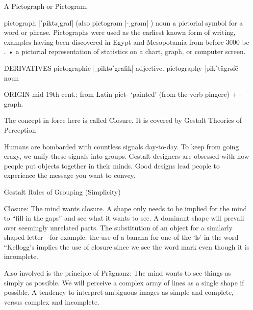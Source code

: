 \documentclass[12pt,a4paper,twocolumn]{book} %
\begin{document}
A Pictograph or Pictogram.

    pictograph |ˈpiktəˌgraf| (also pictogram |-ˌgram| )
    noun
    a pictorial symbol for a word or phrase. Pictographs were used as the earliest known form of writing, examples having been discovered in Egypt and Mesopotamia from before 3000 bc .
    • a pictorial representation of statistics on a chart, graph, or computer screen.

    DERIVATIVES
    pictographic |ˌpiktəˈgrafik| adjective.
    pictography |pikˈtägrəfē| noun

    ORIGIN mid 19th cent.: from Latin pict- ‘painted’ (from the verb pingere) + -graph.



The concept in force here is called Closure.
It is covered by Gestalt Theories of Perception

Humans are bombarded with countless signals day-to-day. To keep from going crazy, we unify these signals into groups. Gestalt designers are obsessed with how people put objects together in their minds. Good designs lead people to experience the message you want to convey.

Gestalt Rules of Grouping (Simplicity)

Closure: The mind wants closure. A shape only needs to be implied for the mind to “fill in the gaps” and see what it wants to see. A dominant shape will prevail over seemingly unrelated parts. The substitution of an object for a similarly shaped letter - for example: the use of a banana for one of the ‘ls’ in the word “Kellogg’s implies the use of closure since we see the word mark even though it is incomplete.

Also involved is the principle of
Prägnanz: The mind wants to see things as simply as possible. We will perceive a complex array of lines as a single shape if possible. A tendency to interpret ambiguous images as simple and complete, versus complex and incomplete.
\end{document}
